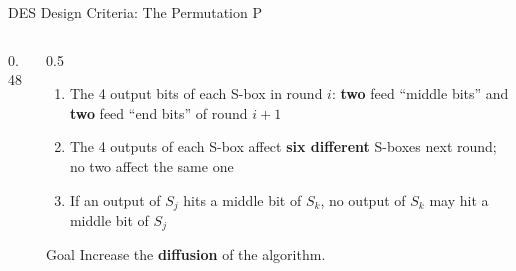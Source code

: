 \documentclass[aspectratio=169,11pt,xcolor={table}]{beamer}
\begin{document}
\begin{frame}{DES Design Criteria: The Permutation P}
  \begin{columns}[c]
    \begin{column}{0.48\textwidth}
      \centering
    \end{column}
    \begin{column}{0.5\textwidth}
      \begin{enumerate}\small\setlength{\itemsep}{3pt}
        \item The 4 output bits of each S-box in round $i$: \textbf{two} feed ``middle bits'' and \textbf{two} feed ``end bits'' of round $i{+}1$
        \item The 4 outputs of each S-box affect \textbf{six different} S-boxes next round; no two affect the same one
        \item If an output of $S_j$ hits a middle bit of $S_k$, no output of $S_k$ may hit a middle bit of $S_j$
      \end{enumerate}
      \begin{block}{Goal}
        \small Increase the \textbf{diffusion} of the algorithm.
      \end{block}
    \end{column}
  \end{columns}
\end{frame}
\end{document}
